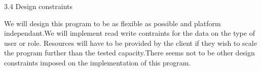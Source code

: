 3.4 Design constraints 

We will design this program to be as flexible as possible and platform independant.We will implement read
write contraints for the data on the type of user or role. Resources will have to be provided by the client if 
they wish to scale the program further than the tested capacity.There seems not to be other design constraints
imposed on the implementation of this program.